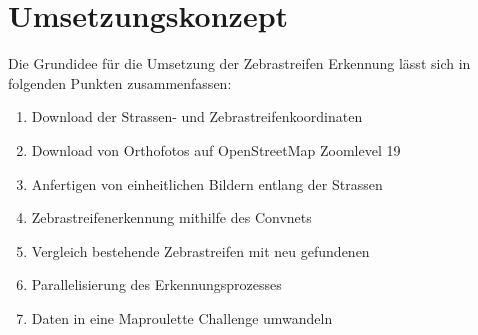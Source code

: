 \section{Umsetzungskonzept}
Die Grundidee für die Umsetzung der Zebrastreifen Erkennung lässt sich in folgenden Punkten zusammenfassen:
\begin{enumerate}
	\item Download der Strassen- und Zebrastreifenkoordinaten
	\item Download von Orthofotos auf OpenStreetMap Zoomlevel 19
	\item Anfertigen von einheitlichen Bildern entlang der Strassen
	\item Zebrastreifenerkennung mithilfe des Convnets
	\item Vergleich bestehende Zebrastreifen mit neu gefundenen
	\item Parallelisierung des Erkennungsprozesses
	\item Daten in eine Maproulette Challenge umwandeln
\end{enumerate}







